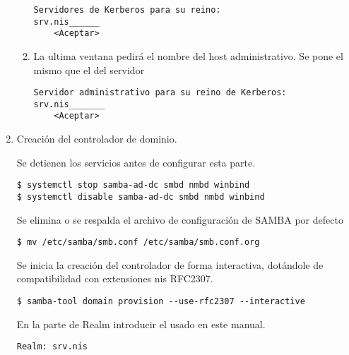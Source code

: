 \documentclass[../main.tex]{subfiles}
\begin{document}
\begin{enumerate}
\begin{enumerate}
                \begin{listing}[H]
\begin{verbatim}
Servidores de Kerberos para su reino:
srv.nis______
    <Aceptar>
\end{verbatim}
\end{listing}

          \item La ultima ventana pedirá el nombre del host administrativo.
                Se pone el mismo que el del servidor

                \begin{listing}[H]
\begin{verbatim}
Servidor administrativo para su reino de Kerberos:
srv.nis_______
    <Aceptar>
\end{verbatim}
\end{listing}



        \end{enumerate}

  \item Creación del controlador de dominio.

        Se detienen los servicios antes de configurar esta parte.
        \begin{listing}[H]
\begin{verbatim}
$ systemctl stop samba-ad-dc smbd nmbd winbind
$ systemctl disable samba-ad-dc smbd nmbd winbind
\end{verbatim}
\end{listing}

        Se elimina o se respalda el archivo de configuración de
        \Gls{SAMBA} por defecto
        \begin{listing}[H]
\begin{verbatim}
$ mv /etc/samba/smb.conf /etc/samba/smb.conf.org
\end{verbatim}
\end{listing}

        Se inicia la creación del controlador de forma interactiva, dotándole de compatibilidad con extensiones \acrshort{nis} RFC2307.
        \begin{listing}[H]
\begin{verbatim}
$ samba-tool domain provision --use-rfc2307 --interactive
\end{verbatim}
\end{listing}

        En la parte de Realm introducir el usado en este manual.
        \begin{listing}[H]
\begin{verbatim}
Realm: srv.nis
\end{verbatim}
\end{listing}


\end{enumerate}
\end{document}

